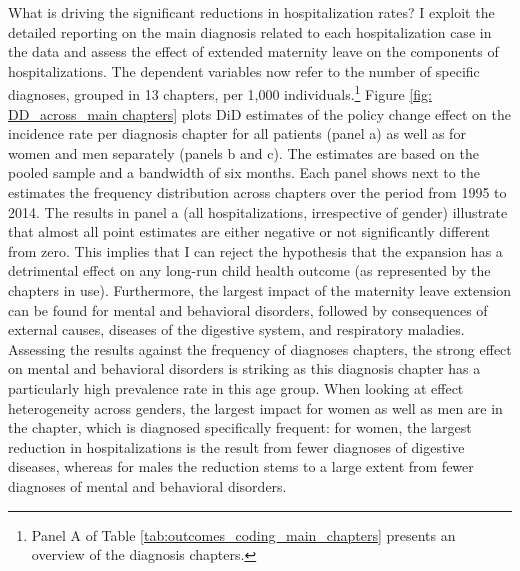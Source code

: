 \documentclass[11pt, a4paper]{article} %
\begin{document}
What is driving the significant reductions in hospitalization rates? I exploit the detailed reporting on the main diagnosis related to each hospitalization case in the data and assess the effect of extended maternity leave on the components of hospitalizations. The dependent variables now refer to the number of specific diagnoses, grouped in 13 chapters, per 1,000 individuals.\footnote{Panel A of Table \ref{tab:outcomes_coding_main_chapters} presents an overview of the diagnosis chapters.} 
Figure \ref{fig: DD_across_main chapters} plots DiD estimates of the policy change effect on the incidence rate per diagnosis chapter for all patients (panel a) as well as for women and men separately (panels b and c). The estimates are based on the pooled sample and a bandwidth of six months. Each panel shows next to the estimates the frequency distribution across chapters over the period from 1995 to 2014. The results in panel a (all hospitalizations, irrespective of gender) illustrate that almost all point estimates are either negative or not significantly different from zero. This implies that I can reject the hypothesis that the expansion has a detrimental effect on any long-run child health outcome (as represented by the chapters in use). Furthermore, the largest impact of the maternity leave extension can be found for mental and behavioral disorders, followed by consequences of external causes, diseases of the digestive system, and respiratory maladies. Assessing the results against the frequency of diagnoses chapters, the strong effect on mental and behavioral disorders is striking as this diagnosis chapter has a particularly high prevalence rate in this age group. When looking at effect heterogeneity across genders, the largest impact for women as well as men are in the chapter, which is diagnosed specifically frequent: for women, the largest reduction in hospitalizations is the result from fewer diagnoses of digestive diseases, whereas for males the reduction stems to a large extent from fewer diagnoses of mental and behavioral disorders. \newline
\end{document}
